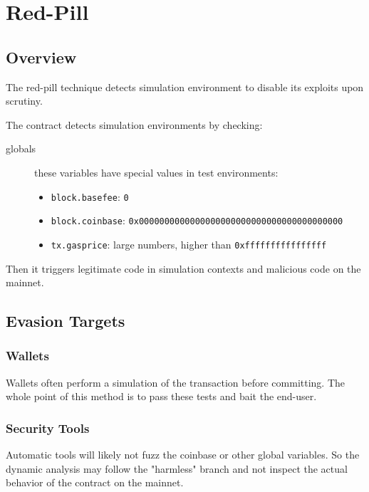 \section{Red-Pill} \label{sec:red-pill}

\subsection{Overview}

The red-pill technique detects simulation environment to disable its exploits upon scrutiny. 

The contract detects simulation environments by checking:

\begin{description}
\item[globals]{these variables have special values in test environments:
\begin{itemize}
    \item{\lstinline[language=Solidity]{block.basefee}: \lstinline{0}}
    \item{\lstinline[language=Solidity]{block.coinbase}: \lstinline{0x0000000000000000000000000000000000000000}}
    \item{\lstinline[language=Solidity]{tx.gasprice}: large numbers, higher than \lstinline{0xffffffffffffffff}}
\end{itemize}}
\end{description}

Then it triggers legitimate code in simulation contexts and malicious code on the mainnet.

\subsection{Evasion Targets}

\subsubsection{Wallets}

Wallets often perform a simulation of the transaction before committing.
The whole point of this method is to pass these tests and bait the end-user.

\subsubsection{Security Tools}

Automatic tools will likely not fuzz the coinbase or other global variables.
So the dynamic analysis may follow the "harmless" branch and not inspect the actual behavior of the contract on the mainnet.

